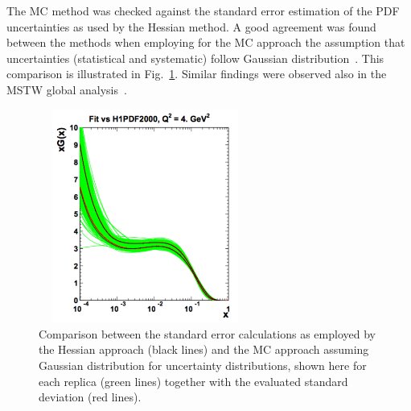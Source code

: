 \begin{description}
The MC method was checked against the standard error estimation of the PDF uncertainties as used by the Hessian method. 
A good agreement was found between the methods when employing for the MC approach the assumption that uncertainties 
(statistical and systematic) follow Gaussian distribution~\cite{hera-lhc:report2009}. 
This comparison is illustrated in Fig.~\ref{fig:mchessian}. 
Similar findings were observed also in the MSTW global analysis~\cite{Watt:2012tq}. 
\begin{figure}[!ht]
 \centering
  \includegraphics[width=7cm,height=7cm]{mchessian.pdf}
  \caption{Comparison between the standard error calculations as employed by the Hessian approach (black lines) 
      and the MC approach assuming Gaussian distribution for uncertainty distributions, shown here for each replica 
          (green lines) together with the evaluated standard deviation (red lines).}
  \label{fig:mchessian}        
\end{figure}
\end{description}


